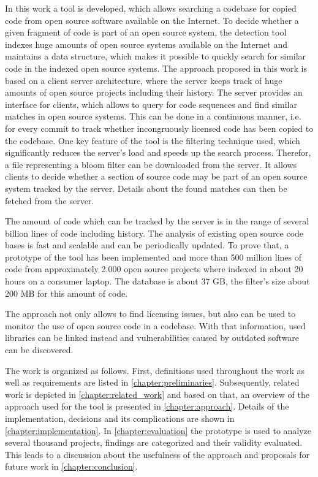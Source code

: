 In this work a tool is developed, which allows searching a codebase for copied code from open source software available on the Internet.
To decide whether a given fragment of code is part of an open source system, the detection tool indexes huge amounts of open source systems available on the Internet and maintains a data structure, which makes it possible to quickly search for similar code in the indexed open source systems.
The approach proposed in this work is based on a client server architecture, where the server keeps track of huge amounts of open source projects including their history.
The server provides an interface for clients, which allows to query for code sequences and find similar matches in open source systems.
This can be done in a continuous manner, i.e. for every commit to track whether incongruously licensed code has been copied to the codebase.
One key feature of the tool is the filtering technique used, which significantly reduces the server's load and speeds up the search process.
Therefor, a file representing a bloom filter can be downloaded from the server.
It allows clients to decide whether a section of source code may be part of an open source system tracked by the server.
Details about the found matches can then be fetched from the server.

The amount of code which can be tracked by the server is in the range of several billion lines of code including history.
The analysis of existing open source code bases is fast and scalable and can be periodically updated.
To prove that, a prototype of the tool has been implemented and more than 500 million lines of code from approximately 2.000 open source projects where indexed in about 20 hours on a consumer laptop.
The database is about 37 GB, the filter's size about 200 MB for this amount of code.

The approach not only allows to find licensing issues, but also can be used to monitor the use of open source code in a codebase.
With that information, used libraries can be linked instead and vulnerabilities caused by outdated software can be discovered.

The work is organized as follows.
First, definitions used throughout the work as well as requirements are listed in \autoref{chapter:preliminaries}.
Subsequently, related work is depicted in \autoref{chapter:related_work} and based on that, an overview of the approach used for the tool is presented in \autoref{chapter:approach}.
Details of the implementation, decisions and its complications are shown in \autoref{chapter:implementation}.
In \autoref{chapter:evaluation} the prototype is used to analyze several thousand projects, findings are categorized and their validity evaluated.
This leads to a discussion about the usefulness of the approach and proposals for future work in \autoref{chapter:conclusion}.
